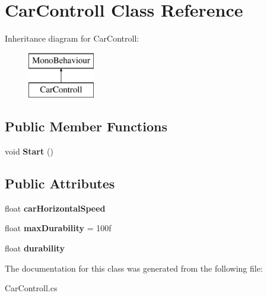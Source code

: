 \hypertarget{class_car_controll}{}\section{Car\+Controll Class Reference}
\label{class_car_controll}
Inheritance diagram for Car\+Controll\+:\begin{figure}[H]
\begin{center}
\leavevmode
\includegraphics[height=2.000000cm]{class_car_controll}
\end{center}
\end{figure}
\subsection*{Public Member Functions}
\begin{DoxyCompactItemize}
\item 
\mbox{\label{class_car_controll_ade3d6320b44eac1fcdc3907100c65f62}} 
void {\bfseries Start} ()
\end{DoxyCompactItemize}
\subsection*{Public Attributes}
\begin{DoxyCompactItemize}
\item 
\mbox{\label{class_car_controll_a21f57feb07197bd6b2c6d25c6480a195}} 
float {\bfseries car\+Horizontal\+Speed}
\item 
\mbox{\label{class_car_controll_a392570ecc618e5f4a8fbb6fe5e316b2d}} 
float {\bfseries max\+Durability} = 100f
\item 
\mbox{\label{class_car_controll_a17e94e73ac019751ffdaf40f55ce8f50}} 
float {\bfseries durability}
\end{DoxyCompactItemize}


The documentation for this class was generated from the following file\+:\begin{DoxyCompactItemize}
\item 
Car\+Controll.\+cs\end{DoxyCompactItemize}
